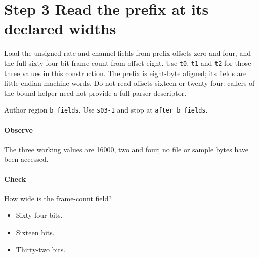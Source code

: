 \section{Step 3 Read the prefix at its declared widths}\label{pcm-wav-s03}
Load the unsigned rate and channel fields from prefix offsets zero and four, and the full sixty-four-bit frame count from offset eight. Use \texttt{t0}, \texttt{t1} and \texttt{t2} for those three values in this construction. The prefix is eight-byte aligned; its fields are little-endian machine words. Do not read offsets sixteen or twenty-four: callers of the bound helper need not provide a full parser descriptor.

Author region \texttt{b\_fields}. Use \texttt{s03-1} and stop at \texttt{after\_b\_fields}.

\paragraph{Observe} The three working values are 16000, two and four; no file or sample bytes have been accessed.

\paragraph{Check} How wide is the frame-count field?
\begin{itemize}
\item[A.] Sixty-four bits.
\item[B.] Sixteen bits.
\item[C.] Thirty-two bits.
\end{itemize}
